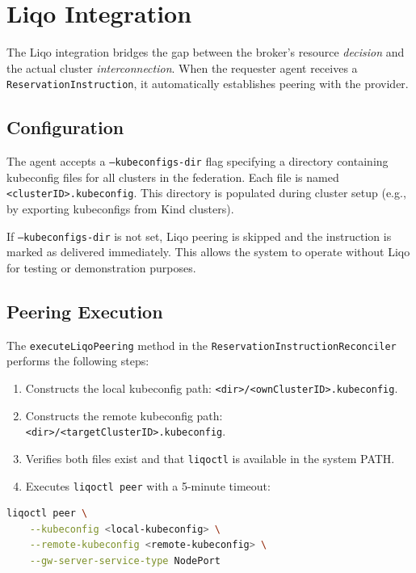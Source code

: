\section{Liqo Integration}
\label{sec:liqo-impl}

The Liqo integration bridges the gap between the broker's resource \emph{decision} and the actual cluster \emph{interconnection}. When the requester agent receives a \texttt{ReservationInstruction}, it automatically establishes peering with the provider.

\subsection{Configuration}

The agent accepts a \texttt{--kubeconfigs-dir} flag specifying a directory containing kubeconfig files for all clusters in the federation. Each file is named \texttt{<clusterID>.kubeconfig}. This directory is populated during cluster setup (e.g., by exporting kubeconfigs from Kind clusters).

If \texttt{--kubeconfigs-dir} is not set, Liqo peering is skipped and the instruction is marked as delivered immediately. This allows the system to operate without Liqo for testing or demonstration purposes.

\subsection{Peering Execution}

The \texttt{executeLiqoPeering} method in the \texttt{ReservationInstructionReconciler} performs the following steps:

\begin{enumerate}
    \item Constructs the local kubeconfig path: \texttt{<dir>/<ownClusterID>.kubeconfig}.
    \item Constructs the remote kubeconfig path: \texttt{<dir>/<targetClusterID>.kubeconfig}.
    \item Verifies both files exist and that \texttt{liqoctl} is available in the system PATH.
    \item Executes \texttt{liqoctl peer} with a 5-minute timeout:
\end{enumerate}

\begin{lstlisting}[language=bash, caption={Liqo peering command}, label={lst:liqo-peer}]
liqoctl peer \
    --kubeconfig <local-kubeconfig> \
    --remote-kubeconfig <remote-kubeconfig> \
    --gw-server-service-type NodePort
\end{lstlisting}

